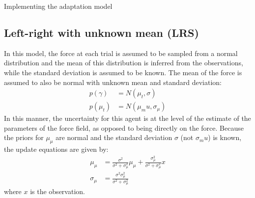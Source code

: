 \documentclass{report}
\begin{document}
\begin{chapter}{Implementing the adaptation model}
\subsection{Left-right with unknown mean (LRS)}
In this model, the force at each trial is assumed to be sampled from a normal
distribution and the mean of this distribution is inferred from the
observations, while the standard deviation is assumed to be known. The mean of
the force is assumed to also be normal with unknown mean and standard
deviation:
\begin{align}
  p(\gamma) &= N(\mu_t, \sigma) \\
  p(\mu_t) &= N(\mu_mu, \sigma_\mu)
\end{align}
In this manner, the uncertainty for this agent is at the level of the estimate
of the parameters of the force field, as opposed to being directly on the
force. Because the priors for $\mu_\mu$ are normal and the standard deviation
$\sigma$ (not $\sigma_mu$) is known, the update equations are given by:
\begin{align}
  \mu_\mu &= \frac{\sigma^2}{\sigma^2 + \sigma_\mu^2}\mu_\mu + \frac{\sigma_\mu^2}{\sigma^2 + \sigma_\mu^2} x \\
  \sigma_\mu &= \frac{\sigma^2\sigma_\mu^2}{\sigma^2 + \sigma_\mu^2}
\end{align}
where $x$ is the observation.


\end{chapter}
\end{document}

